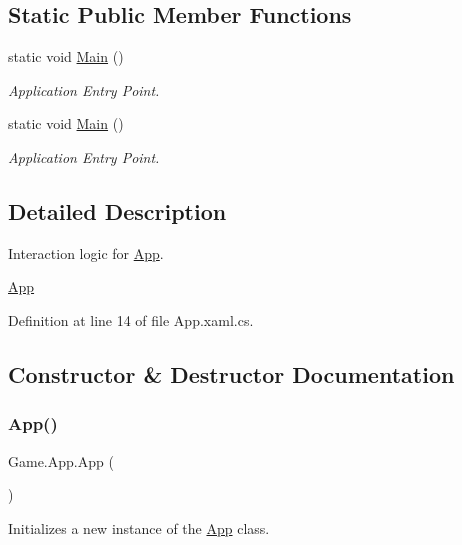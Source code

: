 \subsection*{Static Public Member Functions}
\begin{DoxyCompactItemize}
\item 
static void \mbox{\hyperlink{class_game_1_1_app_a853ce541182011b521a2e83950ab26b9}{Main}} ()
\begin{DoxyCompactList}\small\item\em Application Entry Point. \end{DoxyCompactList}\item 
static void \mbox{\hyperlink{class_game_1_1_app_a853ce541182011b521a2e83950ab26b9}{Main}} ()
\begin{DoxyCompactList}\small\item\em Application Entry Point. \end{DoxyCompactList}\end{DoxyCompactItemize}


\subsection{Detailed Description}
Interaction logic for \mbox{\hyperlink{class_game_1_1_app}{App}}. 

\mbox{\hyperlink{class_game_1_1_app}{App}}

Definition at line 14 of file App.\+xaml.\+cs.



\subsection{Constructor \& Destructor Documentation}
\mbox{\label{class_game_1_1_app_af4bf7636234ca49dba4479bae4ddc155}} 
\subsubsection{\texorpdfstring{App()}{App()}}
{\footnotesize\ttfamily Game.\+App.\+App (\begin{DoxyParamCaption}{ }\end{DoxyParamCaption})}



Initializes a new instance of the \mbox{\hyperlink{class_game_1_1_app}{App}} class. 



